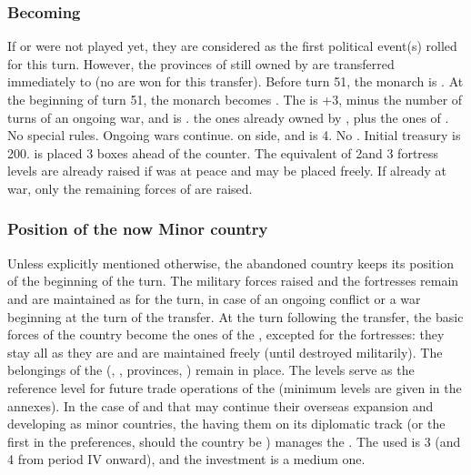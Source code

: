\subsubsection{Becoming \paysmajeurPrusse}
\label{chSpecific:Campaign:Becoming Prussia}
 If  or
 were not played yet, they are considered as the
first political event(s) rolled for this turn. However, the provinces of
 still owned by \paysPologne are transferred
immediately to \PRU (no \VPs are won for this transfer).
 Before turn 51, the monarch is
. At the beginning of turn 51, the monarch becomes
. The \STAB is +3, minus the number of turns of an
ongoing war, and \PRU is .
 the ones already owned by \paysbrandebourg, plus the
ones of .
 No special rules. Ongoing wars continue.
\MNU on side\faceplus, \FTI and \DTI is 4. No \TradeFLEET.
\bparag Initial treasury is 200\ducats.
\aparag[Military]
\bparag {} is placed 3 boxes ahead of the 
counter.
\bparag The equivalent of 2\ARMY\faceplus and 3 fortress levels are already
raised if \paysbrandebourg was at peace and may be placed freely. If already
at war, only the remaining forces of \paysbrandebourg are raised.


\subsubsection{Position of the now Minor country}
 Unless explicitly mentioned
otherwise, the abandoned country keeps its position of the beginning of the
turn.
\bparag The military forces raised and the fortresses remain and are
maintained as  for the turn, in case of an ongoing conflict or
a war beginning at the turn of the transfer.  At the turn following the
transfer, the basic forces of the country become the ones of the \MIN,
excepted for the fortresses: they stay all as they are and are maintained
freely (until destroyed militarily).
\bparag The belongings of the \MAJ (\COL, \TP, provinces, \TradeFLEET) remain
in place. The \TradeFLEET levels serve as the reference level for future trade
operations of the \MIN (minimum levels are given in the annexes).
\bparag[Colonisation] In the case of \paysPortugal and \paysHollande that may
continue their overseas expansion and developing \COL as minor countries, the
\MAJ having them on its diplomatic track (or the first in the preferences,
should the country be \Neutral) manages the \COLaction. The \FTI used is 3
(and 4 from period IV onward), and the investment is a medium one.

